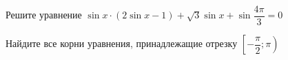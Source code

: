 \begin{ex}
	\begin{condition}
		\begin{enumcols}[label=\asbuk*)]
			\item Решите уравнение \( \sin x\cdot  (2\sin x -1) + \sqrt{3}\sin x + \sin{\dfrac{4\pi}{3}} = 0 \)
			\item Найдите все корни уравнения, принадлежащие отрезку \( \left[-\dfrac{\pi}{2};\pi\right) \)
		\end{enumcols}
	\end{condition}
\end{ex}